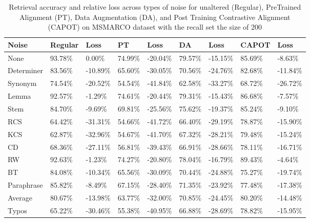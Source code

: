 \begin{table*}[!ht]
    \centering
    
    \begin{tabular}{|l|l|l|l|l|l|l|l|l|}
    \hline
        Noise & Regular & Loss & PT & Loss & DA & Loss & CAPOT & Loss \\ \hline
        None & 93.78\% & 0.00\% & 74.99\% & -20.04\% & 79.57\% & -15.15\% & 85.69\% & -8.63\% \\ \hline
        Determiner & 83.56\% & -10.89\% & 65.60\% & -30.05\% & 70.56\% & -24.76\% & 82.68\% & -11.84\% \\ \hline
        Synonym & 74.54\% & -20.52\% & 54.54\% & -41.84\% & 62.58\% & -33.27\% & 68.72\% & -26.72\% \\ \hline
        Lemma & 92.57\% & -1.29\% & 74.61\% & -20.44\% & 79.31\% & -15.43\% & 86.68\% & -7.57\% \\ \hline
        Stem & 84.70\% & -9.69\% & 69.81\% & -25.56\% & 75.62\% & -19.37\% & 85.24\% & -9.10\% \\ \hline
        RCS & 64.42\% & -31.31\% & 54.66\% & -41.72\% & 66.40\% & -29.19\% & 78.87\% & -15.90\% \\ \hline
        KCS & 62.87\% & -32.96\% & 54.67\% & -41.70\% & 67.32\% & -28.21\% & 79.48\% & -15.24\% \\ \hline
        CD & 68.36\% & -27.11\% & 56.81\% & -39.43\% & 66.91\% & -28.66\% & 78.11\% & -16.71\% \\ \hline
        RW & 92.63\% & -1.23\% & 74.27\% & -20.80\% & 78.04\% & -16.79\% & 89.43\% & -4.64\% \\ \hline
        BT & 84.08\% & -10.34\% & 65.56\% & -30.09\% & 70.44\% & -24.88\% & 75.27\% & -19.74\% \\ \hline
        Paraphrase & 85.82\% & -8.49\% & 67.15\% & -28.40\% & 71.35\% & -23.92\% & 77.48\% & -17.38\% \\ \hline
        Average & 80.67\% & -13.98\% & 63.77\% & -32.00\% & 70.85\% & -24.45\% & 80.20\% & -14.48\% \\ \hline
        Typos & 65.22\% & -30.46\% & 55.38\% & -40.95\% & 66.88\% & -28.69\% & 78.82\% & -15.95\% \\ \hline
    \end{tabular}
    \caption{Retrieval accuracy and relative loss across types of noise for unaltered (Regular), PreTrained Alignment (PT),  Data Augmentation (DA), and Post Training Contrastive Alignment (CAPOT) on MSMARCO dataset with the recall set the size of 200}
    \label{tab:capot-msmarco-200}
\end{table*}